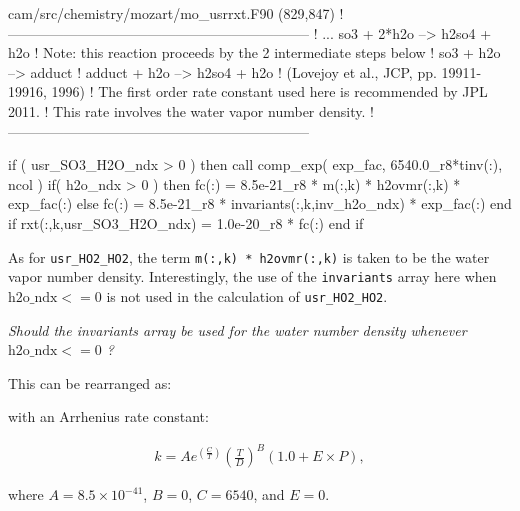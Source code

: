 \documentclass[titlepage]{article}
\begin{document}
\begin{blockcode}[commandchars=\\\{\}]
\color{gray}cam/src/chemistry/mozart/mo_usrrxt.F90 (829,847)
!-----------------------------------------------------------------
!       ... so3 + 2*h2o --> h2so4 + h2o
!       Note: this reaction proceeds by the 2 intermediate steps below
!           so3 + h2o --> adduct
!           adduct + h2o --> h2so4 + h2o
!               (Lovejoy et al., JCP, pp. 19911-19916, 1996)
! The first order rate constant used here is recommended by JPL 2011.
! This rate involves the water vapor number density.
!-----------------------------------------------------------------

       if ( usr_SO3_H2O_ndx > 0 ) then
          call comp_exp( exp_fac, 6540.0_r8*tinv(:), ncol )
          if( h2o_ndx > 0 ) then
             fc(:) = 8.5e-21_r8 * m(:,k) * h2ovmr(:,k) * exp_fac(:)
          else
             fc(:) = 8.5e-21_r8 * invariants(:,k,inv_h2o_ndx) * exp_fac(:)
          end if
          rxt(:,k,usr_SO3_H2O_ndx) = 1.0e-20_r8 * fc(:)
       end if
\end{blockcode}

As for \verb>usr_HO2_HO2>, the term \verb>m(:,k) * h2ovmr(:,k)> is taken to be the water vapor number density. Interestingly, the use of the \verb>invariants> array here when $\mbox{h2o\_ndx} <= 0$ is not used in the calculation of \verb>usr_HO2_HO2>.
\vspace{20px}

\textit{\Large Should the invariants array be used for the water number density whenever $\mbox{h2o\_ndx} <= 0$ ?}

\vspace{20px}
This can be rearranged as:
\vspace{20px}


\vspace{20px}
\noindent with an Arrhenius rate constant:

\begin{equation}
\begin{split}
k = Ae^{(\frac{C}{T})}(\frac{T}{D})^B(1.0+E \times P),
\end{split}
\end{equation}

\noindent where $A = 8.5 \times 10^{-41}$, $B = 0$, $C = 6540$, and $E = 0$.


\end{document}
